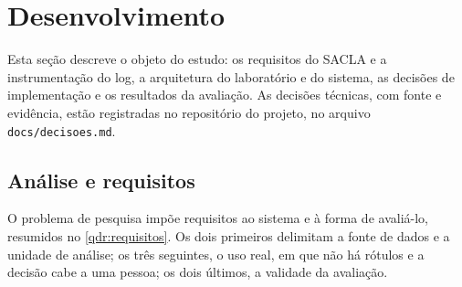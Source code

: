 
\section{Desenvolvimento}
\label{sec:desenvolvimento}

Esta seção descreve o objeto do estudo: os requisitos do SACLA e a instrumentação do log, a
arquitetura do laboratório e do sistema, as decisões de implementação e os resultados da
avaliação. As decisões técnicas, com fonte e evidência, estão registradas no repositório do
projeto, no arquivo \texttt{docs/decisoes.md}.

\subsection{Análise e requisitos}
\label{sec:analise-e-requisitos}

O problema de pesquisa impõe requisitos ao sistema e à forma de avaliá-lo, resumidos no
\autoref{qdr:requisitos}. Os dois primeiros delimitam a fonte de dados e a unidade de análise;
os três seguintes, o uso real, em que não há rótulos e a decisão cabe a uma pessoa; os dois
últimos, a validade da avaliação.

